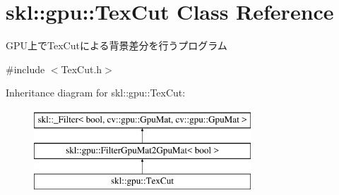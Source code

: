\hypertarget{classskl_1_1gpu_1_1_tex_cut}{}\section{skl\+:\+:gpu\+:\+:Tex\+Cut Class Reference}
\label{classskl_1_1gpu_1_1_tex_cut}


G\+P\+U上で\+Tex\+Cutによる背景差分を行うプログラム  




{\ttfamily \#include $<$Tex\+Cut.\+h$>$}

Inheritance diagram for skl\+:\+:gpu\+:\+:Tex\+Cut\+:\begin{figure}[H]
\begin{center}
\leavevmode
\includegraphics[height=3.000000cm]{classskl_1_1gpu_1_1_tex_cut}
\end{center}
\end{figure}

